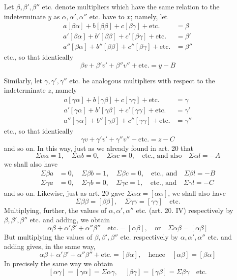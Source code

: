 Let \(\beta,\beta',\beta''\) etc. denote multipliers which have the same relation to the indeterminate \(y\) as \(\alpha,\alpha',\alpha''\) etc. have to \(x\); namely, let
\[
\begin{aligned}
a[\beta\alpha]+b[\beta\beta]+c[\beta\gamma]+\text{etc.}&=\beta\\
a'[\beta\alpha]+b'[\beta\beta]+c'[\beta\gamma]+\text{etc.}&=\beta'\\
a''[\beta\alpha]+b''[\beta\beta]+c''[\beta\gamma]+\text{etc.}&=\beta''
\end{aligned}
\]
etc., so that identically
\[
\beta v+\beta'v'+\beta''v''+\text{etc.}=y-B
\]
\par{}
Similarly, let \(\gamma,\gamma',\gamma''\) etc. be analogous multipliers with respect to the indeterminate \(z\), namely
\[
\begin{aligned}
a[\gamma\alpha]+b[\gamma\beta]+c[\gamma\gamma]+\text{etc.}&=\gamma\\
a'[\gamma\alpha]+b'[\gamma\beta]+c'[\gamma\gamma]+\text{etc.}&=\gamma'\\
a''[\gamma\alpha]+b''[\gamma\beta]+c''[\gamma\gamma]+\text{etc.}&=\gamma''
\end{aligned}
\]
etc., so that identically
\[
\gamma v+\gamma'v'+\gamma''v''+\text{etc.}=z-C
\]
and so on. In this way, just as we already found in art. 20 that
\[
\Sigma\alpha a=1,\quad\Sigma\alpha b=0,\quad\Sigma\alpha c=0,\quad\text{etc., and also}\quad\Sigma\alpha l=-A
\]
we shall also have
\[
\begin{aligned}
\Sigma\beta a&=0,\quad\Sigma\beta b=1,\quad\Sigma\beta c=0,\quad\text{etc., and}\quad\Sigma\beta l=-B\\
\Sigma\gamma a&=0,\quad\Sigma\gamma b=0,\quad\Sigma\gamma c=1,\quad\text{etc., and}\quad\Sigma\gamma l=-C
\end{aligned}
\]
and so on. Likewise, just as art. 20 gave \(\Sigma\alpha\alpha=[\alpha\alpha]\), we shall also have
\[
\Sigma\beta\beta=[\beta\beta],\quad\Sigma\gamma\gamma=[\gamma\gamma]\quad\text{etc.}
\]
Multiplying, further, the values of \(\alpha,\alpha',\alpha''\) etc. (art. 20. IV) respectively by \(\beta,\beta',\beta''\) etc. and adding, we obtain
\[
\alpha\beta+\alpha'\beta'+\alpha''\beta''\quad\text{etc.}=[\alpha\beta],\quad\text{or}\quad\Sigma\alpha\beta=[\alpha\beta]
\]
But multiplying the values of \(\beta,\beta',\beta''\) etc. respectively by \(\alpha,\alpha',\alpha''\) etc. and adding gives, in the same way,
\[
\alpha\beta+\alpha'\beta'+\alpha''\beta''+\text{etc.}=[\beta\alpha],\quad\text{hence}\quad[\alpha\beta]=[\beta\alpha]
\]
In precisely the same way we obtain
\[
[\alpha\gamma]=[\gamma\alpha]=\Sigma\alpha\gamma,\quad[\beta\gamma]=[\gamma\beta]=\Sigma\beta\gamma\quad\text{etc.}
\]
\clearpage
